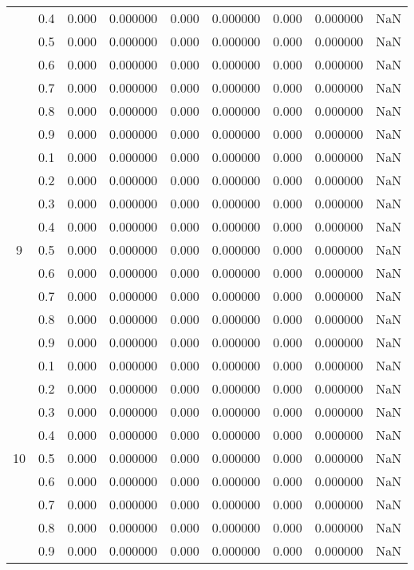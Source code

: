 \begin{longtable}{ | c | c || c | c | c | c | c | c | c | }
 & 0.4 & 0.000 & 0.000000 & 0.000 & 0.000000 & 0.000 & 0.000000 & NaN \\
 & 0.5 & 0.000 & 0.000000 & 0.000 & 0.000000 & 0.000 & 0.000000 & NaN \\
 & 0.6 & 0.000 & 0.000000 & 0.000 & 0.000000 & 0.000 & 0.000000 & NaN \\
 & 0.7 & 0.000 & 0.000000 & 0.000 & 0.000000 & 0.000 & 0.000000 & NaN \\
 & 0.8 & 0.000 & 0.000000 & 0.000 & 0.000000 & 0.000 & 0.000000 & NaN \\
 & 0.9 & 0.000 & 0.000000 & 0.000 & 0.000000 & 0.000 & 0.000000 & NaN \\
 \hline
\multirow{9}{*}{9} & 0.1 & 0.000 & 0.000000 & 0.000 & 0.000000 & 0.000 & 0.000000 & NaN \\
 & 0.2 & 0.000 & 0.000000 & 0.000 & 0.000000 & 0.000 & 0.000000 & NaN \\
 & 0.3 & 0.000 & 0.000000 & 0.000 & 0.000000 & 0.000 & 0.000000 & NaN \\
 & 0.4 & 0.000 & 0.000000 & 0.000 & 0.000000 & 0.000 & 0.000000 & NaN \\
 & 0.5 & 0.000 & 0.000000 & 0.000 & 0.000000 & 0.000 & 0.000000 & NaN \\
 & 0.6 & 0.000 & 0.000000 & 0.000 & 0.000000 & 0.000 & 0.000000 & NaN \\
 & 0.7 & 0.000 & 0.000000 & 0.000 & 0.000000 & 0.000 & 0.000000 & NaN \\
 & 0.8 & 0.000 & 0.000000 & 0.000 & 0.000000 & 0.000 & 0.000000 & NaN \\
 & 0.9 & 0.000 & 0.000000 & 0.000 & 0.000000 & 0.000 & 0.000000 & NaN \\
 \hline
\multirow{9}{*}{10} & 0.1 & 0.000 & 0.000000 & 0.000 & 0.000000 & 0.000 & 0.000000 & NaN \\
 & 0.2 & 0.000 & 0.000000 & 0.000 & 0.000000 & 0.000 & 0.000000 & NaN \\
 & 0.3 & 0.000 & 0.000000 & 0.000 & 0.000000 & 0.000 & 0.000000 & NaN \\
 & 0.4 & 0.000 & 0.000000 & 0.000 & 0.000000 & 0.000 & 0.000000 & NaN \\
 & 0.5 & 0.000 & 0.000000 & 0.000 & 0.000000 & 0.000 & 0.000000 & NaN \\
 & 0.6 & 0.000 & 0.000000 & 0.000 & 0.000000 & 0.000 & 0.000000 & NaN \\
 & 0.7 & 0.000 & 0.000000 & 0.000 & 0.000000 & 0.000 & 0.000000 & NaN \\
 & 0.8 & 0.000 & 0.000000 & 0.000 & 0.000000 & 0.000 & 0.000000 & NaN \\
 & 0.9 & 0.000 & 0.000000 & 0.000 & 0.000000 & 0.000 & 0.000000 & NaN \\
 \hline
\hline
\end{longtable}
 
